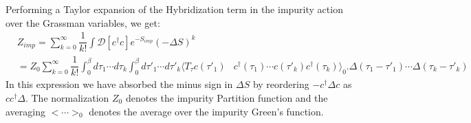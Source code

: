 \documentclass[10pt]{ruthesis}
\begin{document}
Performing a Taylor expansion of the Hybridization term in the impurity action over the Grassman variables, we get:
\begin{align}
&Z_{imp}=\sum_{k=0}^{\infty}\dfrac{1}{k!}\int \mathcal{D}[c^{\dagger}c]e^{-S_{imp}}(-\Delta S)^{k}\\
 &=Z_{0}\sum_{k=0}^{\infty}\dfrac{1}{k!}\int_{0}^{\beta}d\tau_{1}\cdots d\tau_{k}\int_{0}^{\beta}d\tau'_{1}\cdots d\tau'_{k}\langle T_{\tau} c(\tau'_{1}) & c^{\dagger}(\tau_{1})\cdots c(\tau'_{k})c^{\dagger}(\tau_{k})\rangle_{0}. \Delta(\tau_{1}-\tau'_{1})\cdots\Delta(\tau_{k}-\tau'_{k})
 \end{align} 
In this expression we have absorbed the minus sign in $\Delta S$ by reordering $-c^{\dagger}\Delta c$ as  $c c^{\dagger} \Delta$. The normalization $Z_{0}$ denotes the impurity Partition function and the averaging $<\cdots>_{0}$ denotes the average over the impurity Green's function.
\end{document}
